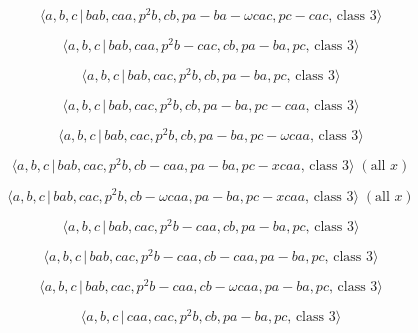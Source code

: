 \documentclass[10pt]{article}
\begin{document}
\begin{equation}
\langle a,b,c\,|\,bab,caa,p^{2}b,cb,pa-ba-\omega cac,pc-cac,\,\text{class }%
3\rangle  \tag{7.2886}
\end{equation}

\begin{equation}
\langle a,b,c\,|\,bab,caa,p^2b-cac,cb,pa-ba,pc,\,\text{class }3\rangle 
\tag{7.2887}
\end{equation}

\begin{equation}
\langle a,b,c\,|\,bab,cac,p^2b,cb,pa-ba,pc,\,\text{class }3\rangle 
\tag{7.2888}
\end{equation}

\begin{equation}
\langle a,b,c\,|\,bab,cac,p^2b,cb,pa-ba,pc-caa,\,\text{class }3\rangle 
\tag{7.2889}
\end{equation}

\begin{equation}
\langle a,b,c\,|\,bab,cac,p^{2}b,cb,pa-ba,pc-\omega caa,\,\text{class }%
3\rangle  \tag{7.2890}
\end{equation}

\begin{equation}
\langle a,b,c\,|\,bab,cac,p^2b,cb-caa,pa-ba,pc-xcaa,\,\text{class }3\rangle
\;(\text{all }x)  \tag{7.2891}
\end{equation}

\begin{equation}
\langle a,b,c\,|\,bab,cac,p^{2}b,cb-\omega caa,pa-ba,pc-xcaa,\,\text{class }%
3\rangle \;(\text{all }x)  \tag{7.2892}
\end{equation}

\begin{equation}
\langle a,b,c\,|\,bab,cac,p^2b-caa,cb,pa-ba,pc,\,\text{class }3\rangle 
\tag{7.2893}
\end{equation}

\begin{equation}
\langle a,b,c\,|\,bab,cac,p^2b-caa,cb-caa,pa-ba,pc,\,\text{class }3\rangle 
\tag{7.2894}
\end{equation}

\begin{equation}
\langle a,b,c\,|\,bab,cac,p^{2}b-caa,cb-\omega caa,pa-ba,pc,\,\text{class }%
3\rangle  \tag{7.2895}
\end{equation}

\begin{equation}
\langle a,b,c\,|\,caa,cac,p^2b,cb,pa-ba,pc,\,\text{class }3\rangle 
\tag{7.2896}
\end{equation}
\end{document}
